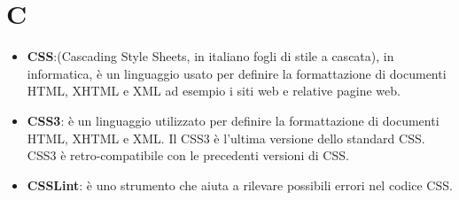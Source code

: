 \section{C}
\begin{itemize}
	\item
	\textbf{CSS}:(Cascading Style Sheets, in italiano fogli di stile a cascata), in informatica, è un linguaggio usato per definire la formattazione di documenti HTML, XHTML e XML ad esempio i siti web e relative pagine web.
	\item
	\textbf{CSS3}: è un linguaggio utilizzato per definire la formattazione di documenti HTML, XHTML e XML. Il CSS3 è l'ultima versione dello standard CSS. CSS3 è retro-compatibile con le precedenti versioni di CSS.
	\item
	\textbf{CSSLint}: è uno strumento che aiuta a rilevare possibili errori nel codice CSS.
\end{itemize}